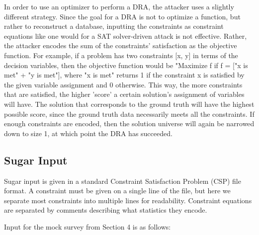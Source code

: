 \documentclass[5p,times,11pt]{elsarticle}
\begin{document}
In order to use an optimizer to perform a DRA, the attacker uses a slightly different strategy. Since the goal for a DRA is not to optimize a function, but rather to reconstruct a database, inputting the constraints as constraint equations like one would for a SAT solver-driven attack is not effective. Rather, the attacker encodes the sum of the constraints' satisfaction as the objective function. For example, if a problem has two constraints [x, y] in terms of the decision variables, then the objective function would be "Maximize f if f = ["x is met" + "y is met"], where "x is met" returns 1 if the constraint x is satisfied by the given variable assignment and 0 otherwise. This way, the more constraints that are satisfied, the higher 'score' a certain solution's assignment of variables will have. The solution that corresponds to the ground truth will have the highest possible score, since the ground truth data necessarily meets all the constraints. If enough constraints are encoded, then the solution universe will again be narrowed down to size 1, at which point the DRA has succeeded.

\subsection{Sugar Input}

Sugar input is given in a standard Constraint Satisfaction Problem (CSP) file format. A constraint must be given on a single line of the file, but here we separate most constraints into multiple lines for readability. Constraint equations are separated by comments describing what statistics they encode.

Input for the mock survey from Section 4 is as follows:
\end{document}
